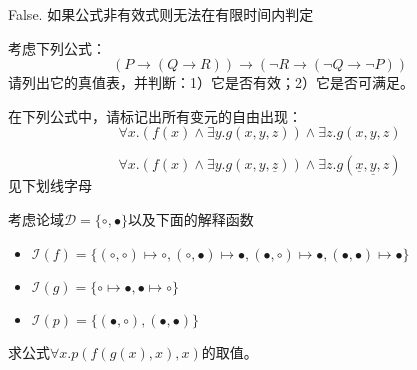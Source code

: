 \documentclass[11pt,a4paper]{article}
\newcommand{\domain}{\mathcal{D}}
\newcommand{\interpretation}{\mathcal{I}}
\begin{document}
\begin{solution}
    False. 如果公式非有效式则无法在有限时间内判定
\end{solution}

\newpage
{}
\subproblem 考虑下列公式：
$$(P \to (Q \to R)) \to (\lnot R \to (\lnot Q \to \lnot P))$$
请列出它的真值表，并判断：1）它是否有效；2）它是否可满足。


\subproblem 在下列公式中，请标记出所有变元的自由出现：
\begin{equation*}
    \forall x. (f(x) \land \exists y.g(x, y, z)) \land \exists z. g(x, y, z)
\end{equation*}

\begin{solution}
	\begin{equation*}
    	\forall x. (f(x) \land \exists y.g(x, y, \underline{z})) \land \exists z. g(\underline{x}, \underline{y}, z)
	\end{equation*}
	见下划线字母 \\
\end{solution}

\subproblem 考虑论域$\domain = \{\circ, \bullet\}$以及下面的解释函数
\begin{itemize}
  \item $\interpretation(f) = \{(\circ, \circ)\mapsto \circ, (\circ, \bullet)\mapsto \bullet, (\bullet, \circ)\mapsto \bullet, (\bullet, \bullet)\mapsto \bullet\}$
  \item $\interpretation(g) = \{\circ \mapsto \bullet, \bullet \mapsto \circ\}$
  \item $\interpretation(p) = \{(\bullet, \circ), (\bullet, \bullet)\}$
\end{itemize}
求公式$\forall x.p(f(g(x), x), x)$的取值。
\end{document}
